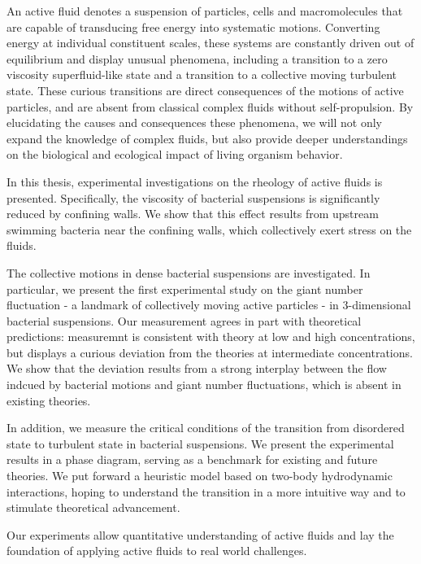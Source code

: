 
An active fluid denotes a suspension of particles, cells and macromolecules that are capable of transducing free energy into systematic motions. Converting energy at individual constituent scales, these systems are constantly driven out of equilibrium and display unusual phenomena, including a transition to a zero viscosity superfluid-like state and a transition to a collective moving turbulent state. These curious transitions are direct consequences of the motions of active particles, and are absent from classical complex fluids without self-propulsion. By elucidating the causes and consequences these phenomena, we will not only expand the knowledge of complex fluids, but also provide deeper understandings on the biological and ecological impact of living organism behavior.

In this thesis, experimental investigations on the rheology of active fluids is presented. Specifically, the viscosity of bacterial suspensions is significantly reduced by confining walls. We show that this effect results from upstream swimming bacteria near the confining walls, which collectively exert stress on the fluids.

The collective motions in dense bacterial suspensions are investigated. In particular, we present the first experimental study on the giant number fluctuation - a landmark of collectively moving active particles - in 3-dimensional bacterial suspensions. Our measurement agrees in part with theoretical predictions: measuremnt is consistent with theory at low and high concentrations, but displays a curious deviation from the theories at intermediate concentrations. We show that the deviation results from a strong interplay between the flow indcued by bacterial motions and giant number fluctuations, which is absent in existing theories.

In addition, we measure the critical conditions of the transition from disordered state to turbulent state in bacterial suspensions. We present the experimental results in a phase diagram, serving as a benchmark for existing and future theories. We put forward a heuristic model based on two-body hydrodynamic interactions, hoping to understand the transition in a more intuitive way and to stimulate theoretical advancement.

Our experiments allow quantitative understanding of active fluids and lay the foundation of applying active fluids to real world challenges.
